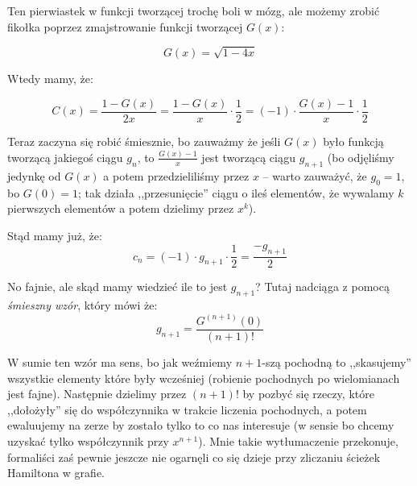         Ten pierwiastek w funkcji tworzącej trochę boli w mózg, ale możemy zrobić fikołka poprzez zmajstrowanie funkcji tworzącej $G(x)$:
        
        \begin{equation*}
            G(x) = \sqrt{1 - 4x}
        \end{equation*}

        Wtedy mamy, że:

        \begin{equation*}
            C(x) = \frac{1 - G(x)}{2x} = \frac{1 - G(x)}{x} \cdot \frac{1}{2} = (-1) \cdot \frac{G(x) - 1}{x} \cdot \frac{1}{2}
        \end{equation*}

        Teraz zaczyna się robić śmiesznie, bo zauważmy że jeśli $G(x)$ było funkcją tworzącą jakiegoś ciągu $g_n$, to $\frac{G(x) - 1}{x}$ jest tworzącą ciągu $g_{n+1}$ (bo odjęliśmy jedynkę od $G(x)$ a potem przedzieliliśmy przez $x$ -- warto zauważyć, że $g_0 = 1$, bo $G(0) = 1$; tak działa ,,przesunięcie'' ciągu o ileś elementów, że wywalamy $k$ pierwszych elementów a potem dzielimy przez $x^k$).

        Stąd mamy już, że: 
        \begin{equation*}
            c_n = (-1) \cdot g_{n+1} \cdot \frac{1}{2} = \frac{-g_{n+1}}{2}
        \end{equation*}

        No fajnie, ale skąd mamy wiedzieć ile to jest $g_{n+1}$? Tutaj nadciąga z pomocą \textit{śmieszny wzór}, który mówi że: 
        \begin{equation*}
            g_{n+1} = \frac{G^{(n+1)}(0)}{(n+1)!}
        \end{equation*}

        W sumie ten wzór ma sens, bo jak weźmiemy $n+1$-szą pochodną to ,,skasujemy'' wszystkie elementy które były wcześniej (robienie pochodnych po wielomianach jest fajne). Następnie dzielimy przez $(n+1)!$ by pozbyć się rzeczy, które ,,dołożyły'' się do współczynnika w trakcie liczenia pochodnych, a potem ewaluujemy na zerze by zostało tylko to co nas interesuje (w sensie bo chcemy uzyskać tylko współczynnik przy $x^{n+1}$). Mnie takie wytłumaczenie przekonuje, formaliści zaś pewnie jeszcze nie ogarnęli co się dzieje przy zliczaniu ścieżek Hamiltona w grafie. 

